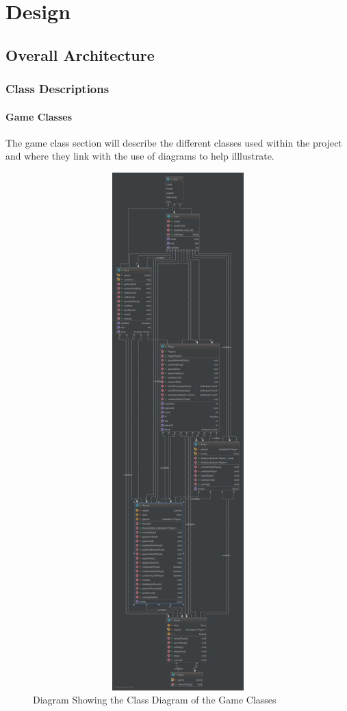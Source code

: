 \chapter{Design}

\section{Overall Architecture}

\subsection{Class Descriptions}
\subsubsection{Game Classes}
The game class section will describe the different classes used within the project and where they link with the use of diagrams to help illlustrate.
\begin{figure}[h]
\centering
\includegraphics[width=15cm ,height=20cm,keepaspectratio]{Game_Classes}
\caption{Diagram Showing the Class Diagram of the Game Classes}
\label{fig:Game_Classes}
\end{figure}
